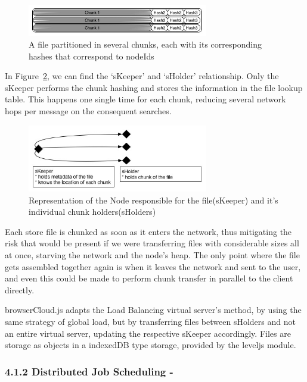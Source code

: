 \begin{figure}[h!]
  \centering
  \includegraphics[width=0.7\textwidth]{img/chunking.jpg}
  \caption{A file partitioned in several chunks, each with its corresponding hashes that correspond to nodeIds}
  \label{fig:chunking}
\end{figure}

In Figure~\ref{fig:skeepersholder}, we can find the `sKeeper' and `sHolder' relationship. Only the sKeeper performs the chunk hashing and stores the information in the file lookup table. This happens one single time for each chunk, reducing several network hops per message on the consequent searches.

\begin{figure}[h!]
  \centering
  \includegraphics[width=0.7\textwidth]{img/skeepersholder.jpg}
  \caption{Representation of the Node responsible for the file(sKeeper) and it's individual chunk holders(sHolders)}
  \label{fig:skeepersholder}
\end{figure}

Each store file is chunked as soon as it enters the network, thus mitigating the risk that would be present if we were transferring files with considerable sizes all at once, starving the network and the node's heap. The only point where the file gets assembled together again is when it leaves the network and sent to the user, and even this could be made to perform chunk transfer in parallel to the client directly.

browserCloud.js adapts the Load Balancing virtual server's method, by using the same strategy of global load, but by transferring files between sHolders and not an entire virtual server, updating the respective sKeeper accordingly. Files are storage as objects in a indexedDB type storage, provided by the leveljs module.

\subsubsection{4.1.2 Distributed Job Scheduling -}

